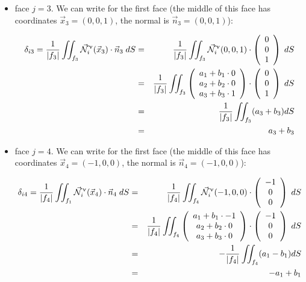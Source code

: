 \begin{itemize}
\item face $j=3$. We can write for the first face (the middle of this face has coordinates 
$\vec{x}_3=(0,0,1)$, the normal is $\vec{n}_3=(0,0,1)$):


\begin{eqnarray}
\delta_{i3}=
\frac{1}{|f_3|} \iint_{f_3}
\vec{{\mathcal{N}}}^\upnu_i( \vec{x}_3) \cdot \vec{n}_3 \; dS
&=&\frac{1}{|f_3|} \iint_{f_3} \vec{{\mathcal{N}}}^\upnu_i( 0,0,1) \cdot 
\left(\begin{array}{c} 0 \\ 0  \\ 1\end{array}\right) \; dS \nonumber\\
&=& \frac{1}{|f_3|} \iint_{f_3} 
\left(\begin{array}{c} a_1+b_1\cdot 0 \\ a_2 + b_2 \cdot 0 \\ a_3 + b_3\cdot 1 \end{array}\right)
\cdot \left(\begin{array}{c} 0 \\ 0 \\ 1 \end{array}\right) \; dS \nonumber\\
&=& \frac{1}{|f_3|} \iint_{f_3} (a_3+b_3) dS \nonumber\\
&=& a_3+b_3
\end{eqnarray}



\item face $j=4$. We can write for the first face (the middle of this face has coordinates 
$\vec{x}_4=(-1,0,0)$, the normal is $\vec{n}_4=(-1,0,0)$):


\begin{eqnarray}
\delta_{i4}=
\frac{1}{|f_4|} \iint_{f_1}
\vec{{\mathcal{N}}}^\upnu_i( \vec{x}_4) \cdot \vec{n}_4 \; dS
&=&\frac{1}{|f_4|} \iint_{f_4} \vec{{\mathcal{N}}}^\upnu_i( -1,0,0) \cdot 
\left(\begin{array}{c} -1 \\ 0  \\ 0\end{array}\right) \; dS \nonumber\\
&=& \frac{1}{|f_4|} \iint_{f_4} 
\left(\begin{array}{c} a_1+b_1\cdot -1 \\ a_2 + b_2 \cdot 0 \\ a_3 + b_3\cdot 0 \end{array}\right)
\cdot \left(\begin{array}{c} -1 \\ 0 \\ 0 \end{array}\right) \; dS \nonumber\\
&=& -\frac{1}{|f_4|} \iint_{f_4} (a_1-b_1) dS \nonumber\\
&=& -a_1+b_1
\end{eqnarray}



\end{itemize}
